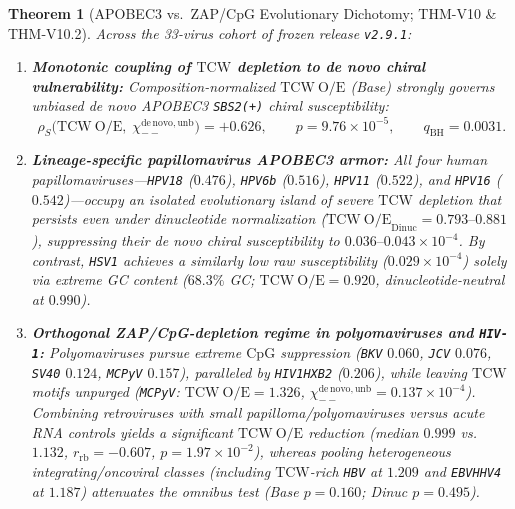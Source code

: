 \documentclass[11pt, a4paper]{article}
\newtheorem{theorem}{Theorem}[section]
\DeclareRobustCommand{\_}{\textunderscore\allowbreak}
\begin{document}
\filbreak
\begin{theorem}[APOBEC3 vs.\ ZAP/CpG Evolutionary Dichotomy; THM-V10 \& THM-V10.2]
\label{thm:v10}
Across the 33-virus cohort of frozen release \texttt{v2.9.1}:
\begin{enumerate}
    \item \textbf{Monotonic coupling of $\mathrm{TCW}$ depletion to \textit{de novo} chiral vulnerability:} Composition-normalized $\mathrm{TCW\ O/E}$ (Base) strongly governs unbiased \textit{de novo} APOBEC3 \texttt{SBS2(+)} chiral susceptibility:
    \begin{equation}
        \rho_S\bigl(\mathrm{TCW\ O/E},\; \chi_{--}^{\mathrm{de\,novo,unb}}\bigr) = +0.626, \qquad p = 9.76 \times 10^{-5}, \qquad q_{\mathrm{BH}} = 0.0031.
    \end{equation}
    \item \textbf{Lineage-specific papillomavirus APOBEC3 armor:} All four human papillomaviruses---\texttt{HPV18} ($0.476$), \texttt{HPV6b} ($0.516$), \texttt{HPV11} ($0.522$), and \texttt{HPV16} ($0.542$)---occupy an isolated evolutionary island of severe $\mathrm{TCW}$ depletion that persists even under dinucleotide normalization ($\mathrm{TCW\ O/E}_{\mathrm{Dinuc}} = 0.793\text{--}0.881$), suppressing their \textit{de novo} chiral susceptibility to $0.036\text{--}0.043 \times 10^{-4}$. By contrast, \texttt{HSV1} achieves a similarly low raw susceptibility ($0.029 \times 10^{-4}$) solely via extreme GC content ($68.3\%$ GC; $\mathrm{TCW\ O/E} = 0.920$, dinucleotide-neutral at $0.990$).
    \item \textbf{Orthogonal ZAP/CpG-depletion regime in polyomaviruses and \texttt{HIV-1}:} Polyomaviruses pursue extreme $\mathrm{CpG}$ suppression (\texttt{BKV} $0.060$, \texttt{JCV} $0.076$, \texttt{SV40} $0.124$, \texttt{MCPyV} $0.157$), paralleled by \texttt{HIV1\_HXB2} ($0.206$), while leaving $\mathrm{TCW}$ motifs unpurged (\texttt{MCPyV}: $\mathrm{TCW\ O/E} = 1.326$, $\chi_{--}^{\mathrm{de\,novo,unb}} = 0.137 \times 10^{-4}$). Combining retroviruses with small papilloma/polyomaviruses versus acute RNA controls yields a significant $\mathrm{TCW\ O/E}$ reduction (median $0.999$ vs.\ $1.132$, $r_{\mathrm{rb}} = -0.607$, $p = 1.97 \times 10^{-2}$), whereas pooling heterogeneous integrating/oncoviral classes (including $\mathrm{TCW}$-rich \texttt{HBV} at $1.209$ and \texttt{EBV\_HHV4} at $1.187$) attenuates the omnibus test (Base $p = 0.160$; Dinuc $p = 0.495$).
\end{enumerate}
\end{theorem}
\end{document}
